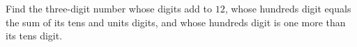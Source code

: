 Find the three-digit number whose digits add to $12$, whose hundreds digit equals the sum of its tens and units digits, and whose hundreds digit is one more than its tens digit.
